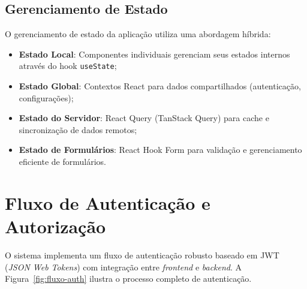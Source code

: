 \subsection{Gerenciamento de Estado}

O gerenciamento de estado da aplicação utiliza uma abordagem híbrida:

\begin{itemize}
    \item \textbf{Estado Local}: Componentes individuais gerenciam seus estados internos através do hook \texttt{useState};
    \item \textbf{Estado Global}: Contextos React para dados compartilhados (autenticação, configurações);
    \item \textbf{Estado do Servidor}: React Query (TanStack Query) para cache e sincronização de dados remotos;
    \item \textbf{Estado de Formulários}: React Hook Form para validação e gerenciamento eficiente de formulários.
\end{itemize}

\section{Fluxo de Autenticação e Autorização}

O sistema implementa um fluxo de autenticação robusto baseado em JWT (\textit{JSON Web Tokens}) com integração entre \textit{frontend} e \textit{backend}. A Figura~\ref{fig:fluxo-auth} ilustra o processo completo de autenticação.

